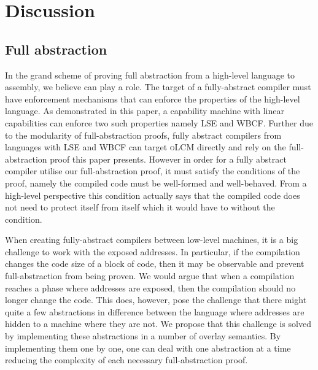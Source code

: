 \documentclass[acmsmall,review,anonymous]{acmart}\settopmatter{printfolios=true,printccs=false,printacmref=false}
\newcommand{\srccm}{\textsc{oLCM}}
\begin{document}


\section{Discussion}
\label{sec:discussion}
\subsection{Full abstraction}
In the grand scheme of proving full abstraction from a high-level language to assembly, we believe \stktokens{} can play a role.
The target of a fully-abstract compiler must have enforcement mechanisms that can enforce the properties of the high-level language.
As demonstrated in this paper, a capability machine with linear capabilities can enforce two such properties namely LSE and WBCF.
Further due to the modularity of full-abstraction proofs, fully abstract compilers from languages with LSE and WBCF can target \srccm{} directly and rely on the full-abstraction proof this paper presents.
However in order for a fully abstract compiler utilise our full-abstraction proof, it must satisfy the conditions of the proof, namely the compiled code must be well-formed and well-behaved.
From a high-level perspective this condition actually says that the compiled code does not need to protect itself from itself which it would have to without the condition.

When creating fully-abstract compilers between low-level machines, it is a big challenge to work with the exposed addresses.
In particular, if the compilation changes the code size of a block of code, then it may be observable and prevent full-abstraction from being proven.
We would argue that when a compilation reaches a phase where addresses are exposed, then the compilation should no longer change the code.
This does, however, pose the challenge that there might quite a few abstractions in difference between the language where addresses are hidden to a machine where they are not.
We propose that this challenge is solved by implementing these abstractions in a number of overlay semantics.
By implementing them one by one, one can deal with one abstraction at a time reducing the complexity of each necessary full-abstraction proof.
\end{document}
